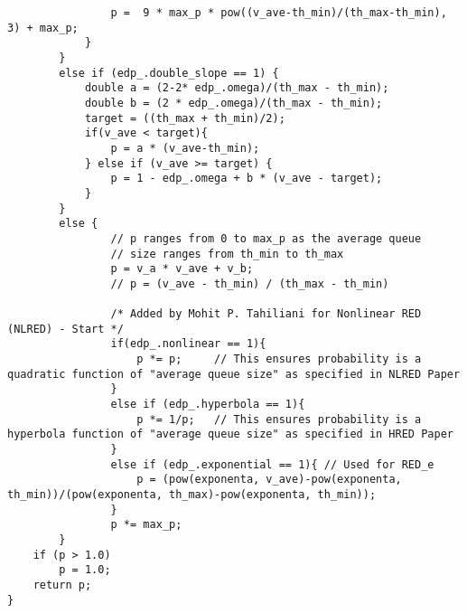 \begin{verbatim}
        		p =  9 * max_p * pow((v_ave-th_min)/(th_max-th_min), 3) + max_p;
        	} 
        }
        else if (edp_.double_slope == 1) {
        	double a = (2-2* edp_.omega)/(th_max - th_min);
        	double b = (2 * edp_.omega)/(th_max - th_min);
        	target = ((th_max + th_min)/2);
        	if(v_ave < target){
        		p = a * (v_ave-th_min);
        	} else if (v_ave >= target) {
        		p = 1 - edp_.omega + b * (v_ave - target);
        	}
        }
        else {
                // p ranges from 0 to max_p as the average queue
                // size ranges from th_min to th_max 
                p = v_a * v_ave + v_b;
                // p = (v_ave - th_min) / (th_max - th_min)
                
                /* Added by Mohit P. Tahiliani for Nonlinear RED (NLRED) - Start */
				if(edp_.nonlinear == 1){
					p *= p;		// This ensures probability is a quadratic function of "average queue size" as specified in NLRED Paper
				}
				else if (edp_.hyperbola == 1){
					p *= 1/p;	// This ensures probability is a hyperbola function of "average queue size" as specified in HRED Paper
				}
				else if (edp_.exponential == 1){ // Used for RED_e
					p = (pow(exponenta, v_ave)-pow(exponenta, th_min))/(pow(exponenta, th_max)-pow(exponenta, th_min));
				}
                p *= max_p; 
        }
	if (p > 1.0)
		p = 1.0;
	return p;
}
\end{verbatim}
